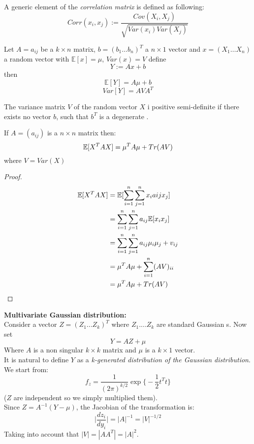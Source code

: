 \begin{defi}
	A generic element of the \textit{correlation matrix} is defined as following:
	\[
	Corr(x_i,x_j) := \frac{Cov(X_i,X_j)}{\sqrt{Var(x_i)Var(X_j)}}	
	\]
\end{defi}

\begin{lem}
Let $A=a_{ij}$ be a $k \times n$ matrix, $b=(b_1 \dots b_n)^T$ a $n\times 1$ vector and  $x=(X_1\dots X_n)$ a random vector with $\mathbb{E}[x]=\mu$, $Var(x)=V$ define 
$$Y:=Ax+b$$
then
$$\mathbb{E}[Y]=A\mu+b$$
$$Var[Y]=AVA^T$$
\end{lem}

\begin{lem}
	The variance matrix $V$ of the random vector $X$ i positive semi-definite if there exists no vector $b$, such that $b^T$ is a degenerate \rv .
\end{lem}

\begin{lem}
If $A=(a_{ij})$ is a $n \times n$ matrix then:
$$\mathbb{E} [X^TAX]=\mu^T A \mu + Tr(AV)$$
where $V=Var(X)$
\end{lem}
\begin{proof}
		\[
	\begin{split}
	\mathbb{E}  [X^TAX]
	&=\mathbb{E}[\sum_{i=1}^{n}\sum_{j=1}^{n}x_i a{ij}x_j]\\
	&=\sum_{i=1}^{n}\sum_{j=1}^{n} a_{ij}\mathbb{E}[x_i x_j]\\
	&=\sum_{i=1}^{n}\sum_{j=1}^{n}a_{ij}\mu_i\mu_j + v_{ij}\\
	&= \mu^T A \mu + \sum_{i=1}^{n}(AV)_{ii}\\
	&=\mu^T A \mu + Tr(AV)
	\end{split}
	\]
\end{proof}

\textbf{Multivariate Gaussian distribution:}\\

Consider a vector $Z=(Z_1...Z_k)^T$ where $Z_1....Z_k$ are \iid standard Gaussian \rv s. Now set 
$$Y=AZ+\mu$$
Where $A$ is a non singular  $k \times k$ matrix and $\mu$ is a $k \times 1$ vector.\\
It is natural to define $Y$ as a \textit{k-generated distribution of the Gaussian distribution}.\\
We start from:
$$f_z=\frac{1}{(2\pi)^{k/2}}\exp \bigg\{ -\frac{1}{2}t^Tt \bigg\}$$
($Z$ are independent so we simply multiplied them).\\
Since $Z=A^{-1}(Y-\mu)$, the Jacobian of the transformation is:
$$\bigg| \frac{dz_i}{dy_i} \bigg|=|A|^{-1}=|V|^{-1/2}$$
Taking into account that $|V|=|AA^T|=|A|^2$.

